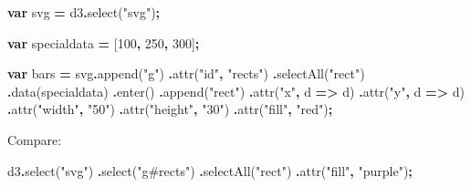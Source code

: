 \documentclass[
  openany]{book}
\newenvironment{Shaded}{\begin{snugshade}}{\end{snugshade}}
\newcommand{\DecValTok}[1]{\textcolor[rgb]{0.00,0.00,0.81}{#1}}
\newcommand{\FunctionTok}[1]{\textcolor[rgb]{0.00,0.00,0.00}{#1}}
\newcommand{\KeywordTok}[1]{\textcolor[rgb]{0.13,0.29,0.53}{\textbf{#1}}}
\newcommand{\NormalTok}[1]{#1}
\newcommand{\OperatorTok}[1]{\textcolor[rgb]{0.81,0.36,0.00}{\textbf{#1}}}
\newcommand{\StringTok}[1]{\textcolor[rgb]{0.31,0.60,0.02}{#1}}
\begin{document}
\begin{Shaded}
\begin{Highlighting}[]
\KeywordTok{var}\NormalTok{ svg }\OperatorTok{=}\NormalTok{ d3}\OperatorTok{.}\FunctionTok{select}\NormalTok{(}\StringTok{"svg"}\NormalTok{)}\OperatorTok{;}

\KeywordTok{var}\NormalTok{ specialdata }\OperatorTok{=}\NormalTok{ [}\DecValTok{100}\OperatorTok{,} \DecValTok{250}\OperatorTok{,} \DecValTok{300}\NormalTok{]}\OperatorTok{;}

\KeywordTok{var}\NormalTok{ bars }\OperatorTok{=}\NormalTok{ svg}\OperatorTok{.}\FunctionTok{append}\NormalTok{(}\StringTok{"g"}\NormalTok{)}
      \OperatorTok{.}\FunctionTok{attr}\NormalTok{(}\StringTok{"id"}\OperatorTok{,} \StringTok{"rects"}\NormalTok{)}
      \OperatorTok{.}\FunctionTok{selectAll}\NormalTok{(}\StringTok{"rect"}\NormalTok{)}
      \OperatorTok{.}\FunctionTok{data}\NormalTok{(specialdata)}
      \OperatorTok{.}\FunctionTok{enter}\NormalTok{()}
      \OperatorTok{.}\FunctionTok{append}\NormalTok{(}\StringTok{"rect"}\NormalTok{)}
        \OperatorTok{.}\FunctionTok{attr}\NormalTok{(}\StringTok{"x"}\OperatorTok{,}\NormalTok{ d }\KeywordTok{=\textgreater{}}\NormalTok{ d)}
        \OperatorTok{.}\FunctionTok{attr}\NormalTok{(}\StringTok{"y"}\OperatorTok{,}\NormalTok{ d }\KeywordTok{=\textgreater{}}\NormalTok{ d)}
        \OperatorTok{.}\FunctionTok{attr}\NormalTok{(}\StringTok{"width"}\OperatorTok{,} \StringTok{"50"}\NormalTok{)}
        \OperatorTok{.}\FunctionTok{attr}\NormalTok{(}\StringTok{"height"}\OperatorTok{,} \StringTok{"30"}\NormalTok{)}
        \OperatorTok{.}\FunctionTok{attr}\NormalTok{(}\StringTok{"fill"}\OperatorTok{,} \StringTok{"red"}\NormalTok{)}\OperatorTok{;}
\end{Highlighting}
\end{Shaded}

Compare:

\begin{Shaded}
\begin{Highlighting}[]
\NormalTok{d3}\OperatorTok{.}\FunctionTok{select}\NormalTok{(}\StringTok{"svg"}\NormalTok{)}
  \OperatorTok{.}\FunctionTok{select}\NormalTok{(}\StringTok{"g\#rects"}\NormalTok{)}
  \OperatorTok{.}\FunctionTok{selectAll}\NormalTok{(}\StringTok{"rect"}\NormalTok{)}
  \OperatorTok{.}\FunctionTok{attr}\NormalTok{(}\StringTok{"fill"}\OperatorTok{,} \StringTok{"purple"}\NormalTok{)}\OperatorTok{;}
\end{Highlighting}
\end{Shaded}
\end{document}

